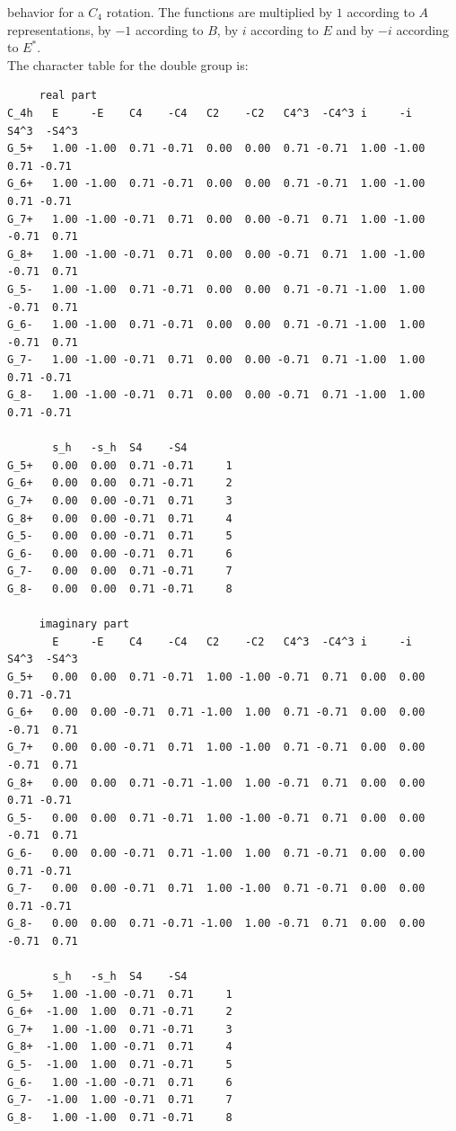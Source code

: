 \documentclass[12pt,a4paper]{article}
\begin{document}
behavior for a $C_4$ rotation. The functions are multiplied by 
$1$ according to $A$ representations, by $-1$ according to $B$,
by $i$ according to $E$ and by $-i$ according to $E^*$. \\
The character table for the double group is:
\begin{verbatim}
     real part
C_4h   E     -E    C4    -C4   C2    -C2   C4^3  -C4^3 i     -i    S4^3  -S4^3
G_5+   1.00 -1.00  0.71 -0.71  0.00  0.00  0.71 -0.71  1.00 -1.00  0.71 -0.71
G_6+   1.00 -1.00  0.71 -0.71  0.00  0.00  0.71 -0.71  1.00 -1.00  0.71 -0.71
G_7+   1.00 -1.00 -0.71  0.71  0.00  0.00 -0.71  0.71  1.00 -1.00 -0.71  0.71
G_8+   1.00 -1.00 -0.71  0.71  0.00  0.00 -0.71  0.71  1.00 -1.00 -0.71  0.71
G_5-   1.00 -1.00  0.71 -0.71  0.00  0.00  0.71 -0.71 -1.00  1.00 -0.71  0.71
G_6-   1.00 -1.00  0.71 -0.71  0.00  0.00  0.71 -0.71 -1.00  1.00 -0.71  0.71
G_7-   1.00 -1.00 -0.71  0.71  0.00  0.00 -0.71  0.71 -1.00  1.00  0.71 -0.71
G_8-   1.00 -1.00 -0.71  0.71  0.00  0.00 -0.71  0.71 -1.00  1.00  0.71 -0.71

       s_h   -s_h  S4    -S4  
G_5+   0.00  0.00  0.71 -0.71     1
G_6+   0.00  0.00  0.71 -0.71     2
G_7+   0.00  0.00 -0.71  0.71     3
G_8+   0.00  0.00 -0.71  0.71     4
G_5-   0.00  0.00 -0.71  0.71     5
G_6-   0.00  0.00 -0.71  0.71     6
G_7-   0.00  0.00  0.71 -0.71     7
G_8-   0.00  0.00  0.71 -0.71     8

     imaginary part
       E     -E    C4    -C4   C2    -C2   C4^3  -C4^3 i     -i    S4^3  -S4^3
G_5+   0.00  0.00  0.71 -0.71  1.00 -1.00 -0.71  0.71  0.00  0.00  0.71 -0.71
G_6+   0.00  0.00 -0.71  0.71 -1.00  1.00  0.71 -0.71  0.00  0.00 -0.71  0.71
G_7+   0.00  0.00 -0.71  0.71  1.00 -1.00  0.71 -0.71  0.00  0.00 -0.71  0.71
G_8+   0.00  0.00  0.71 -0.71 -1.00  1.00 -0.71  0.71  0.00  0.00  0.71 -0.71
G_5-   0.00  0.00  0.71 -0.71  1.00 -1.00 -0.71  0.71  0.00  0.00 -0.71  0.71
G_6-   0.00  0.00 -0.71  0.71 -1.00  1.00  0.71 -0.71  0.00  0.00  0.71 -0.71
G_7-   0.00  0.00 -0.71  0.71  1.00 -1.00  0.71 -0.71  0.00  0.00  0.71 -0.71
G_8-   0.00  0.00  0.71 -0.71 -1.00  1.00 -0.71  0.71  0.00  0.00 -0.71  0.71

       s_h   -s_h  S4    -S4  
G_5+   1.00 -1.00 -0.71  0.71     1
G_6+  -1.00  1.00  0.71 -0.71     2
G_7+   1.00 -1.00  0.71 -0.71     3
G_8+  -1.00  1.00 -0.71  0.71     4
G_5-  -1.00  1.00  0.71 -0.71     5
G_6-   1.00 -1.00 -0.71  0.71     6
G_7-  -1.00  1.00 -0.71  0.71     7
G_8-   1.00 -1.00  0.71 -0.71     8

\end{verbatim}
\end{document}

